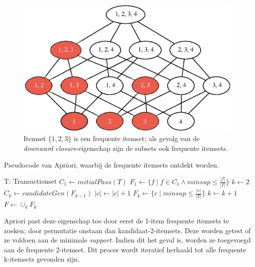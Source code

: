 \begin{figure}
\centering
\caption{Itemset $\{1,2,3\}$ is een frequente itemset; als gevolg van de \emph{downward closure}-eigenschap zijn de subsets ook frequente itemsets.}
\label{figure:downward}
\includegraphics[]{res/downward.eps}
\end{figure}

\begin{algorithm}
\caption{Pseudocode van Apriori, waarbij de frequente itemsets ontdekt worden.}
\label{algo:apriori}
\begin{algorithmic}
\Require T: Transactionset
    \State $C_1 \gets initialPass(T)$
    \State $F_1 \gets \{f \mid f \in C_1 \wedge minsup \leq \frac{|f|}{|T|} \}$
    \State $k\gets 2$
        \State $C_k \gets candidateGen(F_{k-1})$
                    \State $|c|\gets |c| + 1$
                \EndIf
            \EndFor
        \EndFor
        \State $F_k \gets \{c\mid minsup \leq \frac{|c|}{|T|} \}$
        \State $k \gets k + 1$
    \EndWhile
    \State \Return $F \gets \cup_k F_k$ 
\EndFunction
\end{algorithmic}
\end{algorithm}

\newpage
Apriori past deze eigenschap toe door eerst de 1-item frequente itemsets te zoeken; door permutatie onstaan dan kandidaat-2-itemsets. Deze worden getest of ze voldoen aan de minimale \emph{support}. Indien dit het geval is, worden ze toegevoegd aan de frequente 2-itemset. Dit proces wordt iteratief herhaald tot alle frequente k-itemsets gevonden zijn.

